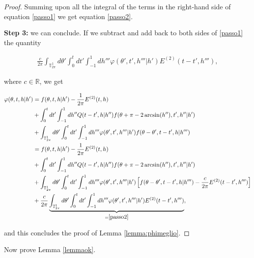 \documentclass[a4paper,10pt,reqno]{amsart}
\numberwithin{equation}{subsection}
\numberwithin{figure}{subsection}
\begin{document}
\begin{proof}
Summing upon all the integral of the terms in the right-hand side of equation \eqref{passo1} we get equation \eqref{passo2}.

\textbf{Step 3:} we can conclude. If we subtract and add back to both sides of \eqref{passo1} the quantity

\begin{align*}
\frac{c}{2\pi}\int_{\mathbb{T}^1_{2\pi}}d\theta'\int_0^tdt'\int_{-1}^1dh'''\varphi(\theta',t',h'''|h')E^{(2)}(t-t',h'''),
\end{align*}

where $c\in\mathbb{R}$, we get

{\footnotesize\begin{align*}
\varphi(\theta,t,h|h')&=f(\theta,t,h|h')-\frac{1}{2\pi}E^{(2)}(t,h)
\\
&+\int_0^tdt'\int_{-1}^1dh''Q(t-t',h|h'')f(\theta+\pi-2\arcsin(h''),t',h''|h')
\\
&+\int_{\mathbb{T}^1_{2\pi}}d\theta'\int_0^tdt'\int_{-1}^1dh'''\varphi(\theta',t',h'''|h')f(\theta-\theta',t-t',h|h''')
\\
&=f(\theta,t,h|h')-\frac{1}{2\pi}E^{(2)}(t,h)
\\
&+\int_0^tdt'\int_{-1}^1dh''Q(t-t',h|h'')f(\theta+\pi-2\arcsin(h''),t',h''|h')
\\
&+\int_{\mathbb{T}^1_{2\pi}}d\theta'\int_0^tdt'\int_{-1}^1dh'''\varphi(\theta',t',h'''|h')\left[f(\theta-\theta',t-t',h|h''')-\frac{c}{2\pi}E^{(2)}(t-t',h''')\right]
\\
&+\frac{c}{2\pi}\underbrace{\int_{\mathbb{T}^1_{2\pi}}d\theta'\int_0^tdt'\int_{-1}^1dh'''\varphi(\theta',t',h'''|h')E^{(2)}(t-t',h''')}_{=\eqref{passo2}},
\end{align*}}

and this concludes the proof of Lemma \ref{lemma:phimeglio}.
\end{proof}
Now prove Lemma \ref{lemmaok}.
\newline
\end{document}
